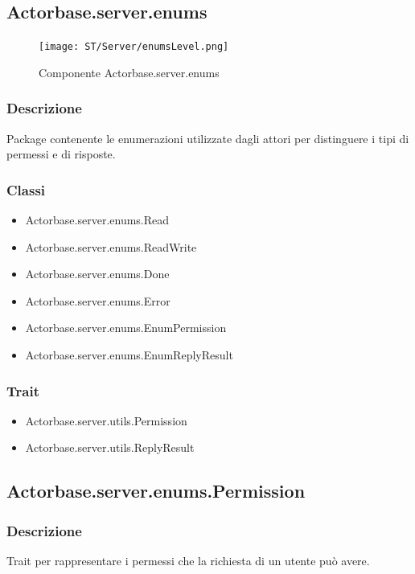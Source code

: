 \documentclass[a4paper]{article}
\begin{document}
		\subsection{Actorbase.server.enums}
		
			\begin{figure} [H]
				\centering
				\texttt{[image: ST/Server/enumsLevel.png]}
				\caption{Componente Actorbase.server.enums}
			\end{figure}
			
			\subsubsection{Descrizione}
				Package contenente le enumerazioni utilizzate dagli attori per distinguere i tipi di permessi e di risposte.
				
			\subsubsection{Classi}
				\begin{itemize}
					\item Actorbase.server.enums.Read
					\item Actorbase.server.enums.ReadWrite
					\item Actorbase.server.enums.Done
					\item Actorbase.server.enums.Error
					\item Actorbase.server.enums.EnumPermission
					\item Actorbase.server.enums.EnumReplyResult
				\end{itemize}
				
			\subsubsection{Trait}
				\begin{itemize}
					\item Actorbase.server.utils.Permission
					\item Actorbase.server.utils.ReplyResult
				\end{itemize}
		
		\subsection{Actorbase.server.enums.Permission}
			\subsubsection{Descrizione}
				Trait per rappresentare i permessi che la richiesta di un utente può avere.
				
\end{document}
